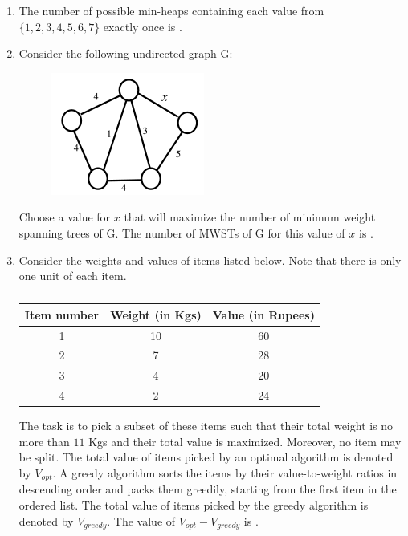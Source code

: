 \documentclass[journal,12pt,onecolumn]{IEEEtran}
\theoremstyle{remark}
\begin{document}
\begin{enumerate}
\hfill{}

\item The number of possible min-heaps containing each value from $\{1, 2, 3, 4, 5, 6, 7\}$ exactly once is \underline{\hspace{2cm}}.

\hfill{}

\item Consider the following undirected graph G:
\begin{figure}[H]
	\centering
	\includegraphics[width=0.2\linewidth]{figs/screenshot005}
	\caption{}
	\label{fig:screenshot005}
\end{figure}

Choose a value for $x$ that will maximize the number of minimum weight spanning trees  of G. The number of MWSTs of G for this value of $x$ is \underline{\hspace{2cm}}.

\hfill{}

\item Consider the weights and values of items listed below. Note that there is only one unit of each item.
\begin{table}[h]
	\centering
	\begin{tabular}{|c|c|c|}
		\hline
		\textbf{Item number} & \textbf{Weight (in Kgs)} & \textbf{Value (in Rupees)} \\ \hline
		1 & 10 & 60 \\ \hline
		2 & 7 & 28 \\ \hline
		3 & 4 & 20 \\ \hline
		4 & 2 & 24 \\ \hline
	\end{tabular}
	\caption*{}
	\label{tab:q48_items}
\end{table}
The task is to pick a subset of these items such that their total weight is no more than $11$ Kgs and their total value is maximized. Moreover, no item may be split. The total value of items picked by an optimal algorithm is denoted by $V_{opt}$. A greedy algorithm sorts the items by their value-to-weight ratios in descending order and packs them greedily, starting from the first item in the ordered list. The total value of items picked by the greedy algorithm is denoted by $V_{greedy}$.
\newline
The value of $V_{opt} - V_{greedy}$ is \underline{\hspace{2cm}}.


\end{enumerate}
\end{document}
